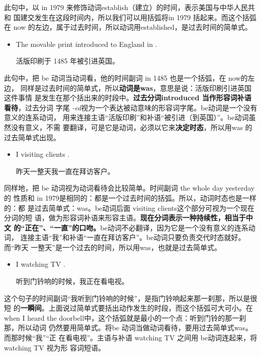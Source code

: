 此句中，以 in 1979 来修饰动词establish（建立）的时间，表示美国与中华人民共和
国建交发生在这段时间内，所以我们可以用括弧将in 1979 括起来。而这个括弧在 now
的左边，属于过去时间，所以动词用established，是过去时间的简单式。

\begin{itemize}
\item  The movable print  introduced to England in .

  活版印刷于 1485 年被引进英国。
\end{itemize}

此句中，把 be 动词当动词看，他的时间副词 in 1485 也是一个括弧，在 now的左边，
同样是过去时间的简单式，所以\textbf{动词是was}，意思是说：活版印刷引进英国这件事情
是发生在那个括出来的时段中。\textbf{过去分词introduced 当作形容词补语看待}，过去分词
字尾 \emph{-ed}视为一个表达被动意味的形容词字尾。be动词是一个没有意义的连系动词，
用来连接主语“活版印刷”和补语“被引进（到英国）”。be动词虽然没有意义，不需
要翻译，可是它是动词，必须以它来\textbf{决定时态}，所以用was 的过去简单式出现。

\begin{itemize}
\item  I  visiting clients  .

  昨天一整天我一直在拜访客户。
\end{itemize}

同样地，把 be 动词视为动词看待会比较简单。时间副词 the whole day yesterday 的
性质和 in 1979是相同的：都是一个过去时间的括弧。所以，动词时态也是一样的：都
是过去简单式：was。be动词后面 visiting clients这个部分可视为一个现在分词的短
语，做为形容词补语来形容主语。\textbf{现在分词表示一种持续性，相当于中文
  的“正在”、“一直”的口吻。}be动词不必翻译，因为它是一个没有意义的连系动词，
连接主语“我”和补语“一直在拜访客户”。be动词只要负责交代时态就好。而“昨天
一整天”是一个过去的时间，所以用was，也就是过去简单式。

\begin{itemize}
\item I  watching TV  .

听到门钤响的时候，我正在看电视。
\end{itemize}

这个句子的时间副词“我听到门铃响的时候”，是指门铃响起来那一刹那，所以是很短
的\textbf{一瞬间}。上面说过简单式要括出动作发生的时段，而这个括弧可大可小。在when I
heard the doorbell中，这个括弧就是最小的一个点：听到门铃的那一刹那，所以动词
仍然要用简单式。将be 动词当做动词看待，要用过去简单式was。而那时候“我”“正
在看电视”。主语与补语 watching TV 之间用 be动词连起来，将 watching TV 视为形
容词短语。

